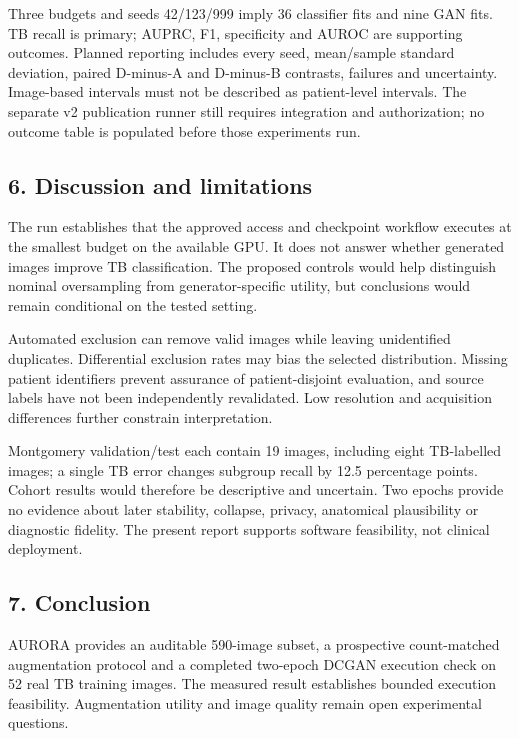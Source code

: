 \documentclass[
]{article}
\begin{document}
Three budgets and seeds 42/123/999 imply 36 classifier fits and nine GAN
fits. TB recall is primary; AUPRC, F1, specificity and AUROC are
supporting outcomes. Planned reporting includes every seed, mean/sample
standard deviation, paired D-minus-A and D-minus-B contrasts, failures
and uncertainty. Image-based intervals must not be described as
patient-level intervals. The separate v2 publication runner still
requires integration and authorization; no outcome table is populated
before those experiments run.

\subsection{6. Discussion and
limitations}\label{discussion-and-limitations}

The run establishes that the approved access and checkpoint workflow
executes at the smallest budget on the available GPU. It does not answer
whether generated images improve TB classification. The proposed
controls would help distinguish nominal oversampling from
generator-specific utility, but conclusions would remain conditional on
the tested setting.

Automated exclusion can remove valid images while leaving unidentified
duplicates. Differential exclusion rates may bias the selected
distribution. Missing patient identifiers prevent assurance of
patient-disjoint evaluation, and source labels have not been
independently revalidated. Low resolution and acquisition differences
further constrain interpretation.

Montgomery validation/test each contain 19 images, including eight
TB-labelled images; a single TB error changes subgroup recall by 12.5
percentage points. Cohort results would therefore be descriptive and
uncertain. Two epochs provide no evidence about later stability,
collapse, privacy, anatomical plausibility or diagnostic fidelity. The
present report supports software feasibility, not clinical deployment.

\subsection{7. Conclusion}\label{conclusion}

AURORA provides an auditable 590-image subset, a prospective
count-matched augmentation protocol and a completed two-epoch DCGAN
execution check on 52 real TB training images. The measured result
establishes bounded execution feasibility. Augmentation utility and
image quality remain open experimental questions.
\end{document}
